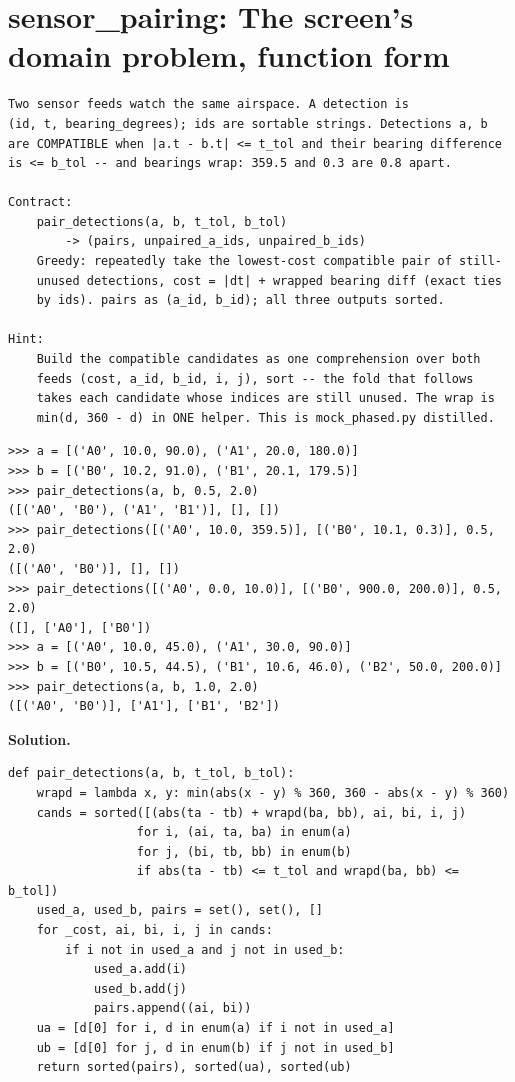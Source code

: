 \documentclass[10pt,letterpaper]{book}
\begin{document}
\section{sensor\_pairing: The screen's domain problem, function form}
\begin{lstlisting}[style=ex]
Two sensor feeds watch the same airspace. A detection is
(id, t, bearing_degrees); ids are sortable strings. Detections a, b
are COMPATIBLE when |a.t - b.t| <= t_tol and their bearing difference
is <= b_tol -- and bearings wrap: 359.5 and 0.3 are 0.8 apart.

Contract:
    pair_detections(a, b, t_tol, b_tol)
        -> (pairs, unpaired_a_ids, unpaired_b_ids)
    Greedy: repeatedly take the lowest-cost compatible pair of still-
    unused detections, cost = |dt| + wrapped bearing diff (exact ties
    by ids). pairs as (a_id, b_id); all three outputs sorted.

Hint:
    Build the compatible candidates as one comprehension over both
    feeds (cost, a_id, b_id, i, j), sort -- the fold that follows
    takes each candidate whose indices are still unused. The wrap is
    min(d, 360 - d) in ONE helper. This is mock_phased.py distilled.
\end{lstlisting}
\begin{lstlisting}[style=ex]
>>> a = [('A0', 10.0, 90.0), ('A1', 20.0, 180.0)]
>>> b = [('B0', 10.2, 91.0), ('B1', 20.1, 179.5)]
>>> pair_detections(a, b, 0.5, 2.0)
([('A0', 'B0'), ('A1', 'B1')], [], [])
>>> pair_detections([('A0', 10.0, 359.5)], [('B0', 10.1, 0.3)], 0.5, 2.0)
([('A0', 'B0')], [], [])
>>> pair_detections([('A0', 0.0, 10.0)], [('B0', 900.0, 200.0)], 0.5, 2.0)
([], ['A0'], ['B0'])
>>> a = [('A0', 10.0, 45.0), ('A1', 30.0, 90.0)]
>>> b = [('B0', 10.5, 44.5), ('B1', 10.6, 46.0), ('B2', 50.0, 200.0)]
>>> pair_detections(a, b, 1.0, 2.0)
([('A0', 'B0')], ['A1'], ['B1', 'B2'])
\end{lstlisting}
\noindent\textbf{Solution.}
\begin{lstlisting}[style=code]
def pair_detections(a, b, t_tol, b_tol):
    wrapd = lambda x, y: min(abs(x - y) % 360, 360 - abs(x - y) % 360)
    cands = sorted([(abs(ta - tb) + wrapd(ba, bb), ai, bi, i, j)
                  for i, (ai, ta, ba) in enum(a)
                  for j, (bi, tb, bb) in enum(b)
                  if abs(ta - tb) <= t_tol and wrapd(ba, bb) <= b_tol])
    used_a, used_b, pairs = set(), set(), []
    for _cost, ai, bi, i, j in cands:
        if i not in used_a and j not in used_b:
            used_a.add(i)
            used_b.add(j)
            pairs.append((ai, bi))
    ua = [d[0] for i, d in enum(a) if i not in used_a]
    ub = [d[0] for j, d in enum(b) if j not in used_b]
    return sorted(pairs), sorted(ua), sorted(ub)
\end{lstlisting}
\end{document}
